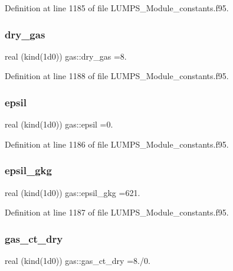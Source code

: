 Definition at line 1185 of file L\+U\+M\+P\+S\+\_\+\+Module\+\_\+constants.\+f95.

\mbox{\label{namespacegas_a380e25a8b858b684637ee899e03d39fe}} 
\subsubsection{\texorpdfstring{dry\+\_\+gas}{dry\_gas}}
{\footnotesize\ttfamily real (kind(1d0)) gas\+::dry\+\_\+gas =8.}



Definition at line 1188 of file L\+U\+M\+P\+S\+\_\+\+Module\+\_\+constants.\+f95.

\mbox{\label{namespacegas_afa96177c3b1c55a70edf05810d52f9f0}} 
\subsubsection{\texorpdfstring{epsil}{epsil}}
{\footnotesize\ttfamily real (kind(1d0)) gas\+::epsil =0.}



Definition at line 1186 of file L\+U\+M\+P\+S\+\_\+\+Module\+\_\+constants.\+f95.

\mbox{\label{namespacegas_adba3767a875b8f50cfbb3e846eecb0fa}} 
\subsubsection{\texorpdfstring{epsil\+\_\+gkg}{epsil\_gkg}}
{\footnotesize\ttfamily real (kind(1d0)) gas\+::epsil\+\_\+gkg =621.}



Definition at line 1187 of file L\+U\+M\+P\+S\+\_\+\+Module\+\_\+constants.\+f95.

\mbox{\label{namespacegas_ac0aae13e9168fcb9f0f09f3559594b4d}} 
\subsubsection{\texorpdfstring{gas\+\_\+ct\+\_\+dry}{gas\_ct\_dry}}
{\footnotesize\ttfamily real (kind(1d0)) gas\+::gas\+\_\+ct\+\_\+dry =8./0.}




